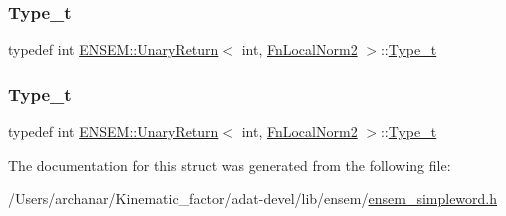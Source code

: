 \mbox{\label{structENSEM_1_1UnaryReturn_3_01int_00_01FnLocalNorm2_01_4_aaa78b86bca8291361ec04d107d900df8}} 
\subsubsection{\texorpdfstring{Type\_t}{Type\_t}\hspace{0.1cm}{\footnotesize\ttfamily [2/3]}}
{\footnotesize\ttfamily typedef int \mbox{\hyperlink{structENSEM_1_1UnaryReturn}{E\+N\+S\+E\+M\+::\+Unary\+Return}}$<$ int, \mbox{\hyperlink{structENSEM_1_1FnLocalNorm2}{Fn\+Local\+Norm2}} $>$\+::\mbox{\hyperlink{structENSEM_1_1UnaryReturn_3_01int_00_01FnLocalNorm2_01_4_aaa78b86bca8291361ec04d107d900df8}{Type\+\_\+t}}}

\mbox{\label{structENSEM_1_1UnaryReturn_3_01int_00_01FnLocalNorm2_01_4_aaa78b86bca8291361ec04d107d900df8}} 
\subsubsection{\texorpdfstring{Type\_t}{Type\_t}\hspace{0.1cm}{\footnotesize\ttfamily [3/3]}}
{\footnotesize\ttfamily typedef int \mbox{\hyperlink{structENSEM_1_1UnaryReturn}{E\+N\+S\+E\+M\+::\+Unary\+Return}}$<$ int, \mbox{\hyperlink{structENSEM_1_1FnLocalNorm2}{Fn\+Local\+Norm2}} $>$\+::\mbox{\hyperlink{structENSEM_1_1UnaryReturn_3_01int_00_01FnLocalNorm2_01_4_aaa78b86bca8291361ec04d107d900df8}{Type\+\_\+t}}}



The documentation for this struct was generated from the following file\+:\begin{DoxyCompactItemize}
\item 
/\+Users/archanar/\+Kinematic\+\_\+factor/adat-\/devel/lib/ensem/\mbox{\hyperlink{adat-devel_2lib_2ensem_2ensem__simpleword_8h}{ensem\+\_\+simpleword.\+h}}\end{DoxyCompactItemize}
